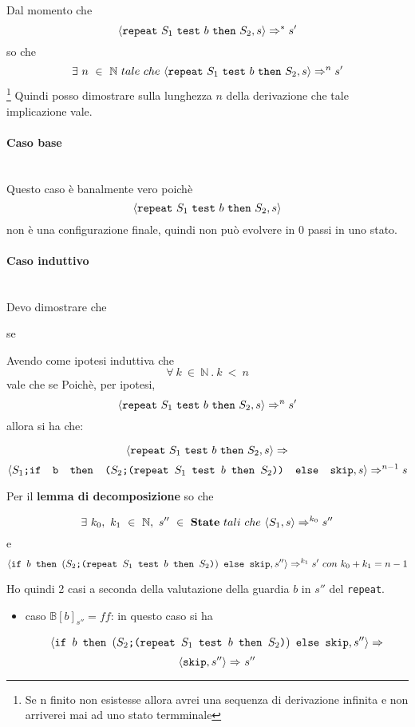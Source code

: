 {	Dal momento che 
	\[ \confSs{\repeatSbS{S_1}{b}{S_2}}{s}\Rar{*}s' \]
	 so che
	\[ \exists{}~n~\in~\mathbb{N}~tale~che~
	\confSs{\repeatSbS{S_1}{b}{S_2}}{s}\Rar{n}s' \]\footnote{Se n finito non esistesse allora avrei una sequenza di derivazione infinita e non arriverei mai ad uno stato termminale }
	Quindi posso dimostrare sulla
	lunghezza $n$ della derivazione che tale implicazione vale.\\
	\paragraph{Caso base}
	
	 \\
	Questo caso è banalmente vero poichè 
\[ \confSs{\repeatSbS{S_1}{b}{S_2}}{s} \]
	non è una configurazione finale,
	quindi non può evolvere in 0 passi in uno stato.
	
	\paragraph{Caso induttivo} 
	
	 \\
	 Devo dimostrare che 
	\begin{center}
	se 
	\end{center}
	Avendo come ipotesi induttiva che 
	\[ \forall{}~k~\in~\mathbb{N}~.~k~<~n  \]vale che se 
	Poichè, per ipotesi, \[ \confSs{\repeatSbS{S_1}{b}{S_2}}{s}\Rar{n}s' \] allora
	si ha che:

\[ 	\confSs{\repeatSbS{S_1}{b}{S_2}}{s}\Rar{}   \]
\[	\confSs{\concat{$S_1$}{\ifABC{b}{(\concat{$S_2$}
	{(\repeatSbS{$S_1$}{$b$}{$S_2$})})}{\skipistr}}}{s}\Rar{n-1}s \]

	Per il \textbf{lemma di decomposizione} so che 

\[ 	\exists{}~k_0,~k_1~\in~
	\mathbb{N},~s''~\in~\states{}~tali~che~\confSs{S_1}{s}\Rar{k_0}s'' \] e 
\[ 	\confSs{\ifABC{b}{(\concat{$S_2$}{(\repeatSbS{$S_1$}{$b$}{$S_2$})})}
	{\skipistr}}{s''}\Rar{k_1}s'~con~k_0+k_1=n-1 \]

	Ho quindi 2 casi a seconda della valutazione della guardia $b$ in $s''$ del
	\texttt{repeat}.
	
	\begin{itemize}
		\item caso $\mathbb{B}[b]_{s''}=ff$: in questo caso si ha 

		\[ \confSs{\ifABC{b}{(\concat{$S_2$}{(\repeatSbS{$S_1$}{$b$}{$S_2$})})}
		{\skipistr}}{s''}\Rar{} \]
		\[ \confSs{\skipistr}{s''}\Rar{}s'' \]


\end{itemize}}
